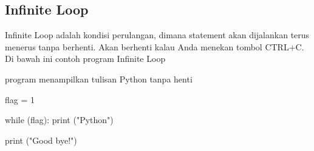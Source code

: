 \subsection{Infinite Loop}
\vspace{\baselineskip}
Infinite Loop adalah kondisi perulangan, dimana statement akan dijalankan terus menerus tanpa berhenti. Akan berhenti kalau Anda menekan tombol CTRL+C.\vspace{\baselineskip}
\vspace{\baselineskip}
Di bawah ini contoh program Infinite Loop\vspace{\baselineskip}
\vspace{\baselineskip}
 \par
program menampilkan tulisan Python tanpa henti \par
\vspace{12pt}
flag = 1 \par
\vspace{12pt}
while (flag): print ("Python") \par
print ("Good bye!") \par
\vspace{12pt}
\vspace{\baselineskip}
\vspace{12pt}

